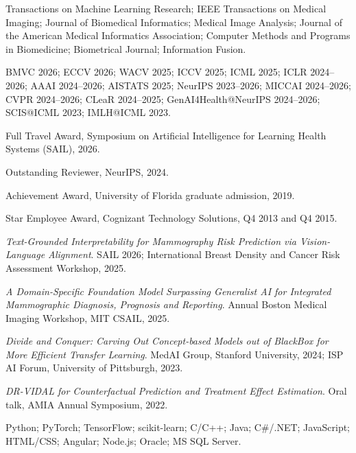 \documentclass[10pt,letterpaper]{article}
\begin{document}
Transactions on Machine Learning Research; IEEE Transactions on Medical Imaging; Journal of Biomedical Informatics; Medical Image Analysis; Journal of the American Medical Informatics Association; Computer Methods and Programs in Biomedicine; Biometrical Journal; Information Fusion.

BMVC 2026; ECCV 2026; WACV 2025; ICCV 2025; ICML 2025; ICLR 2024--2026; AAAI 2024--2026; AISTATS 2025; NeurIPS 2023--2026; MICCAI 2024--2026; CVPR 2024--2026; CLeaR 2024--2025; GenAI4Health@NeurIPS 2024--2026; SCIS@ICML 2023; IMLH@ICML 2023.

\begin{cvitems}
\item Full Travel Award, Symposium on Artificial Intelligence for Learning Health Systems (SAIL), 2026.
\item Outstanding Reviewer, NeurIPS, 2024.
\item Achievement Award, University of Florida graduate admission, 2019.
\item Star Employee Award, Cognizant Technology Solutions, Q4 2013 and Q4 2015.
\end{cvitems}

\begin{cvitems}
\item \textit{Text-Grounded Interpretability for Mammography Risk Prediction via Vision-Language Alignment}. SAIL 2026; International Breast Density and Cancer Risk Assessment Workshop, 2025.
\item \textit{A Domain-Specific Foundation Model Surpassing Generalist AI for Integrated Mammographic Diagnosis, Prognosis and Reporting}. Annual Boston Medical Imaging Workshop, MIT CSAIL, 2025.
\item \textit{Divide and Conquer: Carving Out Concept-based Models out of BlackBox for More Efficient Transfer Learning}. MedAI Group, Stanford University, 2024; ISP AI Forum, University of Pittsburgh, 2023.
\item \textit{DR-VIDAL for Counterfactual Prediction and Treatment Effect Estimation}. Oral talk, AMIA Annual Symposium, 2022.
\end{cvitems}

Python; PyTorch; TensorFlow; scikit-learn; C/C++; Java; C\#/.NET; JavaScript; HTML/CSS; Angular; Node.js; Oracle; MS SQL Server.
\end{document}
